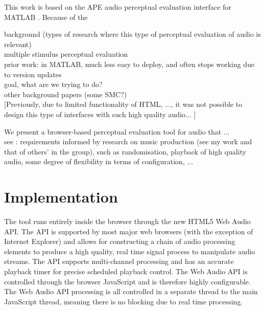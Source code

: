 \documentclass{article}
\begin{document}
This work is based on the APE audio perceptual evaluation interface for MATLAB \cite{deman2014b}. Because of the 

background (types of research where this type of perceptual evaluation of audio is relevant)\\

multiple stimulus perceptual evaluation \cite{bech}\\

prior work: \cite{deman2014b} in MATLAB, much less easy to deploy, and often stops working due to version updates \\ 

goal, what are we trying to do? \\

other background papers (some SMC?)\\

[Previously, due to limited functionality of HTML, ..., it was not possible to design this type of interfaces with such high quality audio... ]



We present a browser-based perceptual evaluation tool for audio that ... \\

see \cite{deman2014b}: requirements informed by research on music production (see my work and that of others' in the group), such as randomisation, playback of high quality audio, some degree of flexibility in terms of configuration, ... \\


\section{Implementation}\label{sec:implementation}



The tool runs entirely inside the browser through the new HTML5 Web Audio API. The API is supported by most major web browsers (with the exception of Internet Explorer) and allows for constructing a chain of audio processing elements to produce a high quality, real time signal process to manipulate audio streams. The API supports multi-channel processing and has an accurate playback timer for precise scheduled playback control. The Web Audio API is controlled through the browser JavaScript and is therefore highly configurable. The Web Audio API processing is all controlled in a separate thread to the main JavaScript thread, meaning there is no blocking due to real time processing. 
\end{document}
